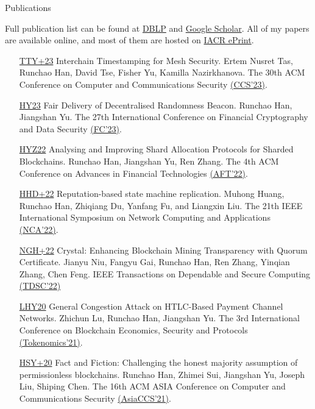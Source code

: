\documentclass{resume} %
\begin{document}
\begin{rSection}{Publications}

    Full publication list can be found at \href{https://dblp.org/pers/hd/h/Han:Runchao}{DBLP} and \href{http://scholar.google.com/citations?user=xbpDocQAAAAJ&hl=en}{Google Scholar}.
    All of my papers are available online, and most of them are hosted on \href{https://eprint.iacr.org/}{IACR ePrint}.

    \begin{itemize}
        \item[\href{https://arxiv.org/pdf/2305.07830.pdf}{TTY+23}] Interchain Timestamping for Mesh Security. Ertem Nusret Tas, Runchao Han, David Tse, Fisher Yu, Kamilla Nazirkhanova. The 30th ACM Conference on Computer and Communications Security \href{https://fc23.ifca.ai/}{(CCS'23)}.
        \item[\href{https://eprint.iacr.org/2023/103}{HY23}] Fair Delivery of Decentralised Randomness Beacon. Runchao Han, Jiangshan Yu. The 27th International Conference on Financial Cryptography and Data Security \href{https://fc23.ifca.ai/}{(FC'23)}.
        \item[\href{https://eprint.iacr.org/2020/943}{HYZ22}] Analysing and Improving Shard Allocation Protocols for Sharded Blockchains. Runchao Han, Jiangshan Yu, Ren Zhang. The 4th ACM Conference on Advances in Financial Technologies \href{https://aft.acm.org/aft22/index.html}{(AFT'22)}.
        \item[\href{https://eprint.iacr.org/2023/169}{HHD+22}] Reputation-based state machine replication. Muhong Huang, Runchao Han, Zhiqiang Du, Yanfang Fu, and Liangxin Liu. The 21th IEEE International Symposium on Network Computing and Applications \href{https://www.nca-ieee.org/2022/index.html}{(NCA'22)}.
        \item[\href{https://ieeexplore.ieee.org/document/9927474/}{NGH+22}] Crystal: Enhancing Blockchain Mining Transparency with Quorum Certificate. Jianyu Niu, Fangyu Gai, Runchao Han, Ren Zhang, Yinqian Zhang, Chen Feng. IEEE Transactions on Dependable and Secure Computing \href{https://ieeexplore.ieee.org/xpl/RecentIssue.jsp?punumber=8858}{(TDSC'22)}
        \item[\href{https://eprint.iacr.org/2020/456.pdf}{LHY20}] General Congestion Attack on HTLC-Based Payment Channel Networks. Zhichun Lu, Runchao Han, Jiangshan Yu. The 3rd International Conference on Blockchain Economics, Security and Protocols \href{https://drops.dagstuhl.de/opus/volltexte/2022/15899/}{(Tokenomics'21)}.
        \item[\href{https://eprint.iacr.org/2019/752}{HSY+20}] Fact and Fiction: Challenging the honest majority assumption of permissionless blockchains. Runchao Han, Zhimei Sui, Jiangshan Yu, Joseph Liu, Shiping Chen. The 16th ACM ASIA Conference on Computer and Communications Security \href{https://dl.acm.org/doi/10.1145/3433210.3453087}{(AsiaCCS'21)}.

\end{itemize}
\end{rSection}
\end{document}
